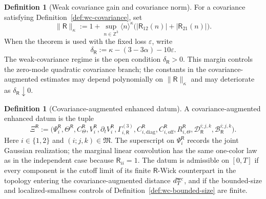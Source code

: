 \documentclass[10pt]{amsart}
\numberwithin{equation}{section}
\theoremstyle{plain}
\theoremstyle{definition}
\newtheorem{definition}[theorem]{Definition}
\theoremstyle{remark}
\newcommand{\eps}{\varepsilon}
\begin{document}
\begin{definition}[Weak covariance gain and covariance norm]\label{def:wc-gain}
For a covariance satisfying Definition~\ref{def:wc-covariance}, set
\begin{equation}\label{eq:wc-covariance-norm}
        \|\mathsf R\|_{\kappa}:=1+
        \sup_{n\in\mathbb Z^3}\langle n\rangle^{\kappa}
        \bigl(|\mathsf R_{12}(n)|+|\mathsf R_{21}(n)|\bigr).
\end{equation}
When the theorem is used with the fixed loss \(\eps\), write
\begin{equation}\label{eq:wc-gain-margin}
        \delta_{\mathsf R}:=
        \kappa-(3-3\alpha)-10\eps.
\end{equation}
The weak-covariance regime is the open condition \(\delta_{\mathsf R}>0\).  This margin controls the zero-mode quadratic covariance branch; the constants in the covariance-augmented estimates may depend polynomially on \(\|\mathsf R\|_\kappa\) and may deteriorate as \(\delta_{\mathsf R}\downarrow0\).
\end{definition}

\begin{definition}[Covariance-augmented enhanced datum]\label{def:wc-enhanced-datum-main}
A covariance-augmented enhanced datum is the tuple
\begin{equation}\label{eq:wc-enhanced-datum-main-tuple}
\Xi^{\mathsf R}:=
\bigl(
\Psi_i^{\mathsf R},\Theta^{\mathsf R},C_\Theta^{\mathsf R},V_i^{\mathsf R},\partial_tV_i^{\mathsf R},
\Gamma_{i,\mathsf R}^{(3)},C_{i,\mathrm{diag}}^{\mathsf R},C_{i,\mathrm{off}}^{\mathsf R},R_{i,\Theta}^{\mathsf R},
\mathcal D_{\mathsf R}^{i;j,k},\mathcal B_{\mathsf R}^{i;j,k}
\bigr).
\end{equation}
Here \(i\in\{1,2\}\) and \((i;j,k)\in\mathfrak M\).  The superscript on \(\Psi_i^{\mathsf R}\) records the joint Gaussian realization; the marginal linear convolution has the same one-color law as in the independent case because \(\mathsf R_{ii}=1\).  The datum is admissible on \([0,T]\) if every component is the cutoff limit of its finite \(\mathsf R\)-Wick counterpart in the topology entering the covariance-augmented distance \(d_T^{\rm wc}\), and if the bounded-size and localized-smallness controls of Definition~\ref{def:wc-bounded-size} are finite.
\end{definition}
\end{document}
